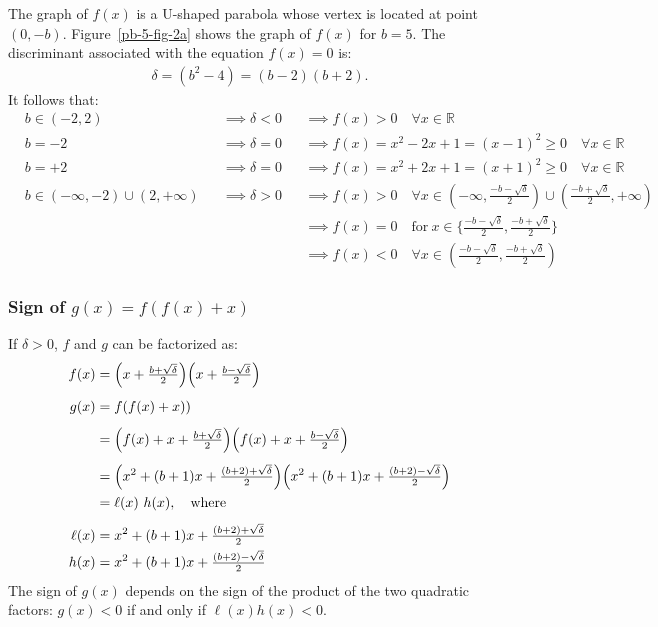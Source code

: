 The graph of $f(x)$ is a U-shaped parabola whose vertex is located at point $(0,-b)$. Figure~\ref{pb-5-fig-2a} shows the graph of $f(x)$ for $b=5$. The discriminant associated with the equation $f(x)=0$ is: 
\begin{align*}
\delta = (b^{2}-4)=(b-2)(b+2). 
\end{align*}
It follows that:
\begin{align*}
& b \in (-2,2) 
&&\implies \delta < 0 
   &&\implies f(x) > 0 \quad \forall x \in \mathbb{R}
\\
& b = -2
&&\implies \delta = 0 
   &&\implies f(x) = x^{2} - 2x + 1 = (x-1)^{2} \ge 0 \quad \forall x \in \mathbb{R}
\\
& b = +2
&&\implies \delta = 0 
   &&\implies f(x) = x^{2} + 2x + 1 = (x+1)^{2} \ge 0 \quad \forall x \in \mathbb{R}
\\
& b \in (-\infty, -2) \cup (2, +\infty)
&&\implies \delta > 0 
   &&\implies f(x) > 0 \quad \forall x \in (-\infty, \tfrac{-b-\sqrt{\delta}}{2}) \cup (\tfrac{-b+\sqrt{\delta}}{2}, +\infty)
\\&&&
   &&\implies f(x) = 0 \quad \text{for}~ x \in \{\tfrac{-b-\sqrt{\delta}}{2}, \tfrac{-b+\sqrt{\delta}}{2}\}
\\&&&
   &&\implies f(x) < 0 \quad \forall x \in (\tfrac{-b-\sqrt{\delta}}{2}, \tfrac{-b+\sqrt{\delta}}{2})
\end{align*}

\subsubsection*{Sign of $g(x)=f(f(x)+x)$}
If $\delta>0$, $f$ and $g$ can be factorized as:
\begin{align*}
f(x) 
& = \Bigl(x+\tfrac{b+\sqrt{\delta}}{2}\Bigr)\Bigl(x+\tfrac{b-\sqrt{\delta}}{2}\Bigr)
\\[1ex]
g(x) 
& = f(f(x)+x))
\\[1ex]
& = \Bigl(f(x)+x+\tfrac{b+\sqrt{\delta}}{2}\Bigr) 
    \Bigl(f(x)+x+\tfrac{b-\sqrt{\delta}}{2}\Bigr)
\\[1ex]
& = \Bigl(x^{2}+(b+1)x + \tfrac{(b+2) + \sqrt{\delta}}{2}\Bigr) 
    \Bigl(x^{2}+(b+1)x + \tfrac{(b+2) - \sqrt{\delta}}{2}\Bigr)
\\
& = \ell(x) \ h(x), \quad \text{where}
\\[1ex]
\ell(x) 
  & = x^{2}+(b+1)x+\tfrac{(b+2)+\sqrt{\delta}}{2}
\\
h(x) 
  & = x^{2}+(b+1)x+\tfrac{(b+2)-\sqrt{\delta}}{2}
\end{align*}
The sign of $g(x)$ depends on the sign of the product of the two quadratic factors: $g(x)<0$ if and only if $\ell(x)h(x)<0$. 

